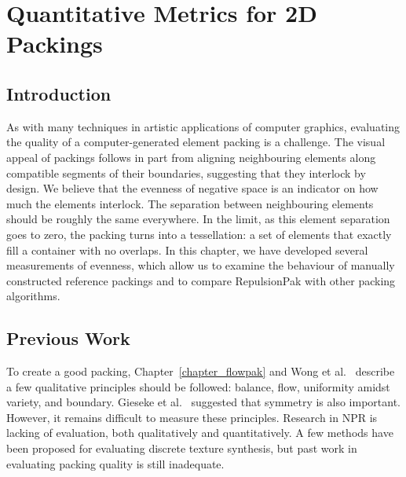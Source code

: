 
\chapter{Quantitative Metrics for 2D Packings}
\label{chapter_qualitative_metrics}


\section{Introduction}


\newtext
{
As with many techniques in artistic applications of computer graphics, evaluating the
quality of a computer-generated element packing is a challenge.
The visual appeal of packings follows in part from aligning neighbouring elements along compatible 
segments of their boundaries, suggesting that they interlock by design. 
We believe that the evenness of negative space is an indicator 
on how much the elements interlock.
The separation between neighbouring elements should be roughly the same everywhere.
In the limit, as this element separation goes to zero,
the packing turns into a tessellation: a set of elements that exactly
fill a container with no overlaps.  
In this chapter, we have developed several measurements of evenness,
which allow us to examine the behaviour of manually constructed reference
packings and to compare RepulsionPak with other packing algorithms.
}

\section{Previous Work}


\newtext
{
To create a good packing, Chapter~\ref{chapter_flowpak} and Wong et al.~\cite{Wong1998} describe
a few qualitative principles should be followed: balance, flow, uniformity amidst variety, and boundary.
Gieseke et al.~\cite{Gieseke2017} suggested that symmetry is also important.
However, it remains difficult to measure these principles.
Research in NPR is lacking of evaluation, both qualitatively and quantitatively.
A few methods have been proposed for evaluating discrete texture synthesis,
but past work in evaluating packing quality is still inadequate.
}

